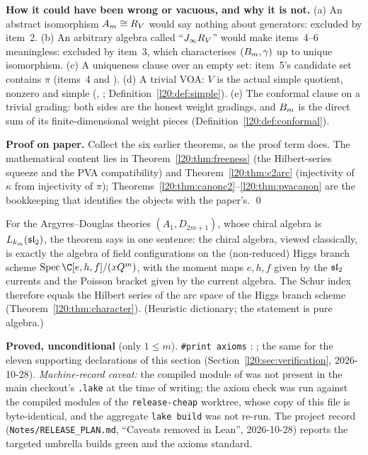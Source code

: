 \begin{dictionary}
\textbf{How it could have been wrong or vacuous, and why it is not.} (a) An abstract isomorphism $A_m\cong R_V$ would say
nothing about generators: excluded by item~2. (b) An arbitrary algebra called ``$J_\infty R_V$'' would make items~4--6
meaningless: excluded by item~3, which characterises $(B_m,\gamma)$ up to unique isomorphism. (c) A uniqueness clause over
an empty set: item~5's candidate set contains $\pi$ (items~4 and ). (d) A trivial VOA: $V$ is the actual
simple quotient, nonzero and simple (, ; Definition~\ref{l20:def:simple}).
(e) The conformal clause on a trivial grading: both sides are the honest weight gradings, and $B_m$ is the direct sum of
its finite-dimensional weight pieces (Definition~\ref{l20:def:conformal}).
\end{dictionary}

\textbf{Proof on paper.} Collect the six earlier theorems, as the proof term does. The mathematical content lies in
Theorem~\ref{l20:thm:freeness} (the Hilbert-series squeeze and the PVA compatibility) and Theorem~\ref{l20:thm:c2arc}
(injectivity of $\kappa$ from injectivity of $\pi$); Theorems~\ref{l20:thm:canonc2}--\ref{l20:thm:pvacanon} are the
bookkeeping that identifies the objects with the paper's. \qed

\begin{physics}
For the Argyres--Douglas theories $(A_1,D_{2m+1})$, whose chiral algebra is $L_{k_m}(\mathfrak{sl}_2)$, the theorem says in one
sentence: the chiral algebra, viewed classically, is exactly the algebra of field configurations on the (non-reduced) Higgs
branch scheme $\operatorname{Spec}\C[e,h,f]/(x\ltwentyQ^m)$, with the moment maps $e,h,f$ given by the $\mathfrak{sl}_2$ currents
and the Poisson bracket given by the current algebra. The Schur index therefore equals the Hilbert series of the arc space of
the Higgs branch scheme (Theorem~\ref{l20:thm:character}). (Heuristic dictionary; the statement is pure algebra.)
\end{physics}

\begin{status}
\textbf{Proved, unconditional} (only $1\le m$). \texttt{\#print axioms} :
; the same for the eleven supporting declarations of this section
(Section~\ref{l20:sec:verification}, 2026-10-28). \emph{Machine-record caveat:} the compiled module of
 was not present in the main checkout's
\texttt{.lake} at the time of writing; the axiom check was run against the compiled modules of the \texttt{release-cheap}
worktree, whose copy of this file is byte-identical, and the aggregate \texttt{lake build} was not re-run. The project record
(\texttt{Notes/RELEASE\_PLAN.md}, ``Caveats removed in Lean'', 2026-10-28) reports the targeted umbrella builds green and the
axioms standard.
\end{status}


